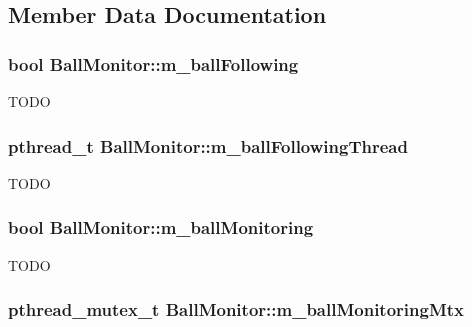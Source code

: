 \subsection{Member Data Documentation}
\hypertarget{classBallMonitor_ada441cfbcbac3335a118348945e8b6c7}{
\subsubsection[{m\_\-ballFollowing}]{\setlength{\rightskip}{0pt plus 5cm}bool {\bf BallMonitor::m\_\-ballFollowing}}}
\label{classBallMonitor_ada441cfbcbac3335a118348945e8b6c7}
TODO \hypertarget{classBallMonitor_af2b98e5dca99d4d2efc01330d84400d6}{
\subsubsection[{m\_\-ballFollowingThread}]{\setlength{\rightskip}{0pt plus 5cm}pthread\_\-t {\bf BallMonitor::m\_\-ballFollowingThread}}}
\label{classBallMonitor_af2b98e5dca99d4d2efc01330d84400d6}
TODO \hypertarget{classBallMonitor_ac991e138d7e4ae238d2a68365c1caa68}{
\subsubsection[{m\_\-ballMonitoring}]{\setlength{\rightskip}{0pt plus 5cm}bool {\bf BallMonitor::m\_\-ballMonitoring}}}
\label{classBallMonitor_ac991e138d7e4ae238d2a68365c1caa68}
TODO \hypertarget{classBallMonitor_a5a9a84961419fefc7131d449bab07b0f}{
\subsubsection[{m\_\-ballMonitoringMtx}]{\setlength{\rightskip}{0pt plus 5cm}pthread\_\-mutex\_\-t {\bf BallMonitor::m\_\-ballMonitoringMtx}}}
